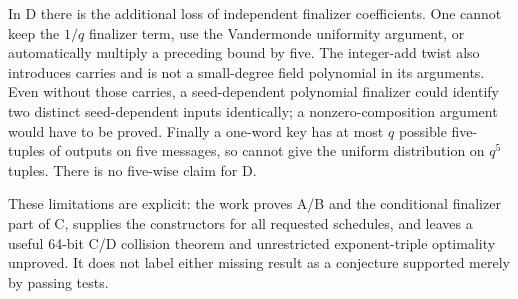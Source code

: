 \documentclass[
  11pt,
]{article}
\begin{document}
In D there is the additional loss of independent finalizer coefficients.
One cannot keep the \(1/q\) finalizer term, use the Vandermonde
uniformity argument, or automatically multiply a preceding bound by
five. The integer-add twist also introduces carries and is not a
small-degree field polynomial in its arguments. Even without those
carries, a seed-dependent polynomial finalizer could identify two
distinct seed-dependent inputs identically; a nonzero-composition
argument would have to be proved. Finally a one-word key has at most
\(q\) possible five-tuples of outputs on five messages, so cannot give
the uniform distribution on \(q^5\) tuples. There is no five-wise claim
for D.

These limitations are explicit: the work proves A/B and the conditional
finalizer part of C, supplies the constructors for all requested
schedules, and leaves a useful 64-bit C/D collision theorem and
unrestricted exponent-triple optimality unproved. It does not label
either missing result as a conjecture supported merely by passing tests.
\end{document}
